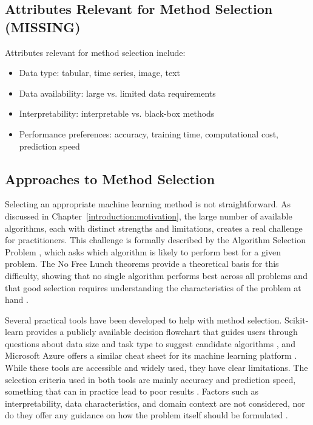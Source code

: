 \subsection{Attributes Relevant for Method Selection (MISSING)}

Attributes relevant for method selection include:
\begin{itemize}
    \item Data type: tabular, time series, image, text
    \item Data availability: large vs. limited data requirements
    \item Interpretability: interpretable vs. black-box methods
    \item Performance preferences: accuracy, training time, computational cost, prediction speed
\end{itemize}


\subsection{Approaches to Method Selection}

Selecting an appropriate machine learning method is not straightforward. 
As discussed in Chapter~\ref{introduction:motivation}, the large number of 
available algorithms, each with distinct strengths and limitations, creates 
a real challenge for practitioners. This challenge is formally described by 
the Algorithm Selection Problem \parencite{smith_miles2009algorithm_selection}, 
which asks which algorithm is likely to perform best for a given problem. 
The No Free Lunch theorems provide a theoretical basis for this difficulty, 
showing that no single algorithm performs best across all problems and that 
good selection requires understanding the characteristics of the problem at 
hand \parencite{wolpert1997no_free_lunch}.

Several practical tools have been developed to help with method selection. 
Scikit-learn provides a publicly available decision flowchart that guides 
users through questions about data size and task type to suggest candidate 
algorithms \parencite{sklearn_algorithm_cheatsheet}, and Microsoft Azure 
offers a similar cheat sheet for its machine learning platform 
\parencite{azure_algorithm_cheatsheet}. While these tools are accessible 
and widely used, they have clear limitations. 
The selection criteria used in both tools are mainly accuracy and prediction 
speed, something that can in practice lead to poor results \parencite{sala2018selecting_ml_algorithm}. 
Factors such as interpretability, data characteristics, and domain context 
are not considered, nor do they offer any guidance on how the problem 
itself should be formulated \parencite{chen2023ml_manufacturing_industry4}.

